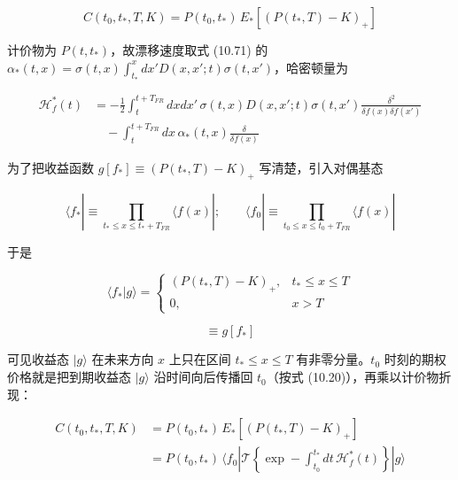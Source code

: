 \begin{equation*}
C(t_0,t_*,T,K)=P(t_0,t_*)\,E_*\left[(P(t_*,T)-K)_+\right]
\tag{10.75}
\end{equation*}

计价物为 $P(t,t_*)$，故漂移速度取式 (10.71) 的 $\alpha_*(t,x)=\sigma(t,x)\int_{t_*}^x dx'D(x,x';t)\sigma(t,x')$，哈密顿量为

\begin{equation*}
\begin{aligned}
\mathcal{H}_f^*(t)&=-\frac{1}{2}\int_t^{t+T_{FR}}dxdx'\,\sigma(t,x)D(x,x';t)\sigma(t,x')\frac{\delta^2}{\delta f(x)\delta f(x')}\\
&\quad-\int_t^{t+T_{FR}}dx\,\alpha_*(t,x)\frac{\delta}{\delta f(x)}
\end{aligned}
\end{equation*}

为了把收益函数 $g[f_*]\equiv(P(t_*,T)-K)_+$ 写清楚，引入对偶基态

\begin{equation*}
\langle f_*|\equiv\prod_{t_*\le x\le t_*+T_{FR}}\langle f(x)|;\qquad
\langle f_0|\equiv\prod_{t_0\le x\le t_0+T_{FR}}\langle f(x)|
\tag{10.76}
\end{equation*}

于是

\begin{equation*}
\langle f_*|g\rangle=
\begin{cases}
(P(t_*,T)-K)_+, & t_*\le x\le T\\
0, & x>T
\end{cases}
\tag{10.77a}
\end{equation*}

\begin{equation*}
\equiv g[f_*]
\tag{10.77b}
\end{equation*}

可见收益态 $|g\rangle$ 在未来方向 $x$ 上只在区间 $t_*\le x\le T$ 有非零分量。$t_0$ 时刻的期权价格就是把到期收益态 $|g\rangle$ 沿时间向后传播回 $t_0$（按式 (10.20)），再乘以计价物折现：

\begin{equation*}
\begin{aligned}
C(t_0,t_*,T,K)&=P(t_0,t_*)\,E_*\left[(P(t_*,T)-K)_+\right]\\
&=P(t_0,t_*)\,\langle f_0|\mathcal{T}\left\{\exp-\int_{t_0}^{t_*}dt\,\mathcal{H}_f^*(t)\right\}|g\rangle
\end{aligned}
\tag{10.78}
\end{equation*}

